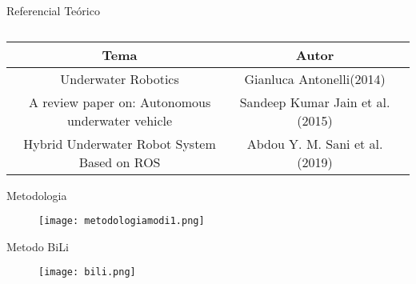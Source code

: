 \begin{frame}[t]{Referencial Teórico}
\vspace{0.5cm}
     \begin{table}[ht!]
    \centering
        \caption{}
            \begin{tabular}{|c|c|c|} \hline
             \textbf{Tema}&\textbf{Autor}\\ \hline
             Underwater Robotics & Gianluca Antonelli(2014)\\ \hline
             A review paper on: Autonomous underwater vehicle & Sandeep Kumar Jain et al.(2015) \\ \hline
             Hybrid Underwater Robot System Based on ROS & Abdou Y. M. Sani et al. (2019)\\ \hline
         \end{tabular}
     \end{table}

\end{frame}
\begin{frame}[c]{Metodologia }
        \begin{figure}
        \texttt{[image: metodologiamodi1.png]}
    \end{figure}
\end{frame}
\begin{frame}[c]{Metodo BiLi}
        \begin{figure}
        \texttt{[image: bili.png]}
    \end{figure}
\end{frame}

